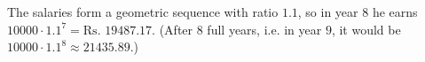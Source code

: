 The salaries form a geometric sequence with ratio $1.1$, so in year $8$ he earns $10000\cdot1.1^7=\boxed{\text{Rs.\ }19487.17}$. (After $8$ full years, i.e. in year $9$, it would be $10000\cdot1.1^8\approx21435.89$.)
